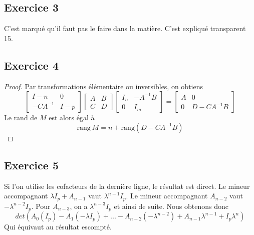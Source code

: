 \subsection*{Exercice 3}
C'est marqué qu'il faut pas le faire dans la matière. C'est expliqué transparent 15.

\subsection*{Exercice 4}
\begin{proof}
Par transformations élémentaire ou inversibles, on obtiens
\begin{equation}
\begin{bmatrix}
I-n & 0 \\
-CA^{-1} & I-p
\end{bmatrix}
\begin{bmatrix}
A & B \\
C & D
\end{bmatrix}
\begin{bmatrix}
I_n & -A^{-1}B \\
0 & I_m
\end{bmatrix}
=
\begin{bmatrix}
A & 0 \\
0 & D-CA^{-1}B
\end{bmatrix}
\end{equation}
Le rand de $M$ est alors égal à
$$\text{rang} \ M = n + \text{rang} (D-CA^{-1}B)$$
\end{proof}

\subsection*{Exercice 5}

Si l'on utilise les cofacteurs de la dernière ligne, le résultat est direct. Le mineur accompagnant $\lambda I_p + A_{n-1}$ vaut $\lambda^{n-1}I_p$. Le mineur accompagnant $A_{n-2}$ vaut $-\lambda^{n-2}I_p$. Pour $A_{n-3}$, on a $\lambda^{n-3}I_p$ et ainsi de suite. Nous obtenons donc
$$ det(A_0(I_p) - A_1(-\lambda I_p) + ... - A_{n-2}( -\lambda^{n-2}) + A_{n-1}\lambda^{n-1} + I_p\lambda^n)$$
Qui équivaut au résultat escompté.
